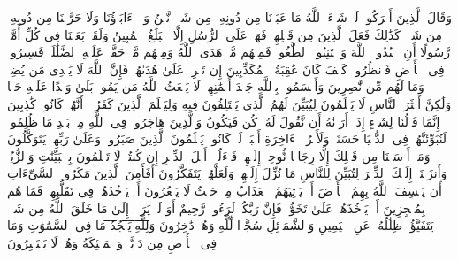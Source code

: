 \startbuffer[\q:16:35]
وَقَالَ ٱلَّذِینَ أَشۡرَكُوا۟ لَوۡ شَاۤءَ ٱللَّهُ مَا عَبَدۡنَا مِن دُونِهِۦ مِن شَیۡءࣲ نَّحۡنُ وَلَاۤ ءَابَاۤؤُنَا وَلَا حَرَّمۡنَا مِن دُونِهِۦ مِن شَیۡءࣲۚ كَذَٰلِكَ فَعَلَ ٱلَّذِینَ مِن قَبۡلِهِمۡۚ فَهَلۡ عَلَى ٱلرُّسُلِ إِلَّا ٱلۡبَلَٰغُ ٱلۡمُبِینُ%
\stopbuffer
\startbuffer[\q:16:36]
وَلَقَدۡ بَعَثۡنَا فِی كُلِّ أُمَّةࣲ رَّسُولًا أَنِ ٱعۡبُدُوا۟ ٱللَّهَ وَٱجۡتَنِبُوا۟ ٱلطَّٰغُوتَۖ فَمِنۡهُم مَّنۡ هَدَى ٱللَّهُ وَمِنۡهُم مَّنۡ حَقَّتۡ عَلَیۡهِ ٱلضَّلَٰلَةُۚ فَسِیرُوا۟ فِی ٱلۡأَرۡضِ فَٱنظُرُوا۟ كَیۡفَ كَانَ عَٰقِبَةُ ٱلۡمُكَذِّبِینَ%
\stopbuffer
\startbuffer[\q:16:37]
إِن تَحۡرِصۡ عَلَىٰ هُدَىٰهُمۡ فَإِنَّ ٱللَّهَ لَا یَهۡدِی مَن یُضِلُّۖ وَمَا لَهُم مِّن نَّٰصِرِینَ%
\stopbuffer
\startbuffer[\q:16:38]
وَأَقۡسَمُوا۟ بِٱللَّهِ جَهۡدَ أَیۡمَٰنِهِمۡ لَا یَبۡعَثُ ٱللَّهُ مَن یَمُوتُۚ بَلَىٰ وَعۡدًا عَلَیۡهِ حَقࣰّا وَلَٰكِنَّ أَكۡثَرَ ٱلنَّاسِ لَا یَعۡلَمُونَ%
\stopbuffer
\startbuffer[\q:16:39]
لِیُبَیِّنَ لَهُمُ ٱلَّذِی یَخۡتَلِفُونَ فِیهِ وَلِیَعۡلَمَ ٱلَّذِینَ كَفَرُوۤا۟ أَنَّهُمۡ كَانُوا۟ كَٰذِبِینَ%
\stopbuffer
\startbuffer[\q:16:40]
إِنَّمَا قَوۡلُنَا لِشَیۡءٍ إِذَاۤ أَرَدۡنَٰهُ أَن نَّقُولَ لَهُۥ كُن فَیَكُونُ%
\stopbuffer
\startbuffer[\q:16:41]
وَٱلَّذِینَ هَاجَرُوا۟ فِی ٱللَّهِ مِنۢ بَعۡدِ مَا ظُلِمُوا۟ لَنُبَوِّئَنَّهُمۡ فِی ٱلدُّنۡیَا حَسَنَةࣰۖ وَلَأَجۡرُ ٱلۡءَاخِرَةِ أَكۡبَرُۚ لَوۡ كَانُوا۟ یَعۡلَمُونَ%
\stopbuffer
\startbuffer[\q:16:42]
ٱلَّذِینَ صَبَرُوا۟ وَعَلَىٰ رَبِّهِمۡ یَتَوَكَّلُونَ%
\stopbuffer
\startbuffer[\q:16:43]
وَمَاۤ أَرۡسَلۡنَا مِن قَبۡلِكَ إِلَّا رِجَالࣰا نُّوحِیۤ إِلَیۡهِمۡۖ فَسۡءَلُوۤا۟ أَهۡلَ ٱلذِّكۡرِ إِن كُنتُمۡ لَا تَعۡلَمُونَ%
\stopbuffer
\startbuffer[\q:16:44]
بِٱلۡبَیِّنَٰتِ وَٱلزُّبُرِۗ وَأَنزَلۡنَاۤ إِلَیۡكَ ٱلذِّكۡرَ لِتُبَیِّنَ لِلنَّاسِ مَا نُزِّلَ إِلَیۡهِمۡ وَلَعَلَّهُمۡ یَتَفَكَّرُونَ%
\stopbuffer
\startbuffer[\q:16:45]
أَفَأَمِنَ ٱلَّذِینَ مَكَرُوا۟ ٱلسَّیِّءَاتِ أَن یَخۡسِفَ ٱللَّهُ بِهِمُ ٱلۡأَرۡضَ أَوۡ یَأۡتِیَهُمُ ٱلۡعَذَابُ مِنۡ حَیۡثُ لَا یَشۡعُرُونَ%
\stopbuffer
\startbuffer[\q:16:46]
أَوۡ یَأۡخُذَهُمۡ فِی تَقَلُّبِهِمۡ فَمَا هُم بِمُعۡجِزِینَ%
\stopbuffer
\startbuffer[\q:16:47]
أَوۡ یَأۡخُذَهُمۡ عَلَىٰ تَخَوُّفࣲ فَإِنَّ رَبَّكُمۡ لَرَءُوفࣱ رَّحِیمٌ%
\stopbuffer
\startbuffer[\q:16:48]
أَوَ لَمۡ یَرَوۡا۟ إِلَىٰ مَا خَلَقَ ٱللَّهُ مِن شَیۡءࣲ یَتَفَیَّؤُا۟ ظِلَٰلُهُۥ عَنِ ٱلۡیَمِینِ وَٱلشَّمَاۤئِلِ سُجَّدࣰا لِّلَّهِ وَهُمۡ دَٰخِرُونَ%
\stopbuffer
\startbuffer[\q:16:49]
وَ̅لِ̅لَّ̅هِ̅ ̅یَ̅سۡ̅جُ̅دُ̅ مَا فِی ٱلسَّمَٰوَٰتِ وَمَا فِی ٱلۡأَرۡضِ مِن دَاۤبَّةࣲ وَٱلۡمَلَٰۤئِكَةُ وَهُمۡ لَا یَسۡتَكۡبِرُونَ%
\stopbuffer
